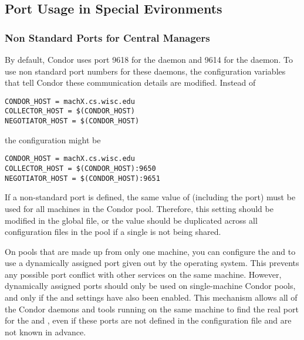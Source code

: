 \subsection{\label{sec:Port-Details}Port Usage in Special Evironments }


\subsubsection{\label{sec:Ports-NonStandard}Non Standard Ports for Central Managers}
By default,
Condor uses port 9618 for the  daemon
and 9614 for the  daemon.
To use non standard port numbers for these daemons,
the configuration variables that tell Condor these communication
details are modified.
Instead of
\begin{verbatim}
CONDOR_HOST = machX.cs.wisc.edu
COLLECTOR_HOST = $(CONDOR_HOST)
NEGOTIATOR_HOST = $(CONDOR_HOST)
\end{verbatim}
the configuration might be
\begin{verbatim}
CONDOR_HOST = machX.cs.wisc.edu
COLLECTOR_HOST = $(CONDOR_HOST):9650
NEGOTIATOR_HOST = $(CONDOR_HOST):9651
\end{verbatim}

If a non-standard port is defined, the same value of
 (including the port) must be used for all
machines in the Condor pool.
Therefore, this setting should be modified in the global
 file, or the value should be duplicated across
all configuration files in the pool if a single 
is not being shared.

On pools that are made up from only one machine, you can configure the
 and  to use a dynamically
assigned port given out by the operating system.
This prevents any possible port conflict with other services on the
same machine.
However, dynamically assigned ports should only be used on
single-machine Condor pools, and only if the
 and 
settings have also been enabled.
This mechanism allows all of the Condor daemons and tools running on
the same machine to find the real port for the  and
, even if these ports are not defined in the
configuration file and are not known in advance.

